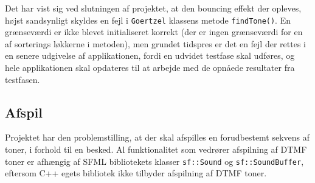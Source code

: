 Det har vist sig ved slutningen af projektet, at den bouncing effekt der opleves, højst sandsynligt skyldes en fejl i \texttt{Goertzel} klassens metode \texttt{findTone()}. En grænseværdi er ikke blevet initialiseret korrekt (der er ingen grænseværdi for en af sorterings løkkerne i metoden), men grundet tidspres er det en fejl der rettes i en senere udgivelse af applikationen, fordi en udvidet testfase skal udføres, og hele applikationen skal opdateres til at arbejde med de opnåede resultater fra testfasen.

\subsection{Afspil}
Projektet har den problemstilling, at der skal afspilles en forudbestemt sekvens af toner, i forhold til en besked.
\newline
Al funktionalitet som vedrører afspilning af DTMF toner er afhængig af SFML bibliotekets klasser \texttt{sf::\textcolor{dkgreen}{Sound}} og \texttt{sf::\textcolor{dkgreen}{SoundBuffer}}, eftersom C++ egets bibliotek ikke tilbyder afspilning af DTMF toner.
\hfill \break

